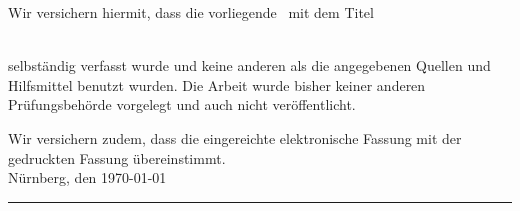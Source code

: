 Wir versichern hiermit, dass die vorliegende \ausarbeitung~mit dem Titel

\emph{\titel}\\
selbständig verfasst wurde und keine anderen als die angegebenen Quellen und Hilfsmittel benutzt wurden. Die Arbeit wurde bisher keiner anderen Prüfungsbehörde vorgelegt und auch nicht veröffentlicht.


Wir versichern zudem, dass die eingereichte elektronische Fassung mit der gedruckten Fassung übereinstimmt.\\[10ex]

Nürnberg, den \today \\[4ex]


\rule[-0.2cm]{10cm}{0.5pt} \\

\textsc{\autor} \\[10ex]
